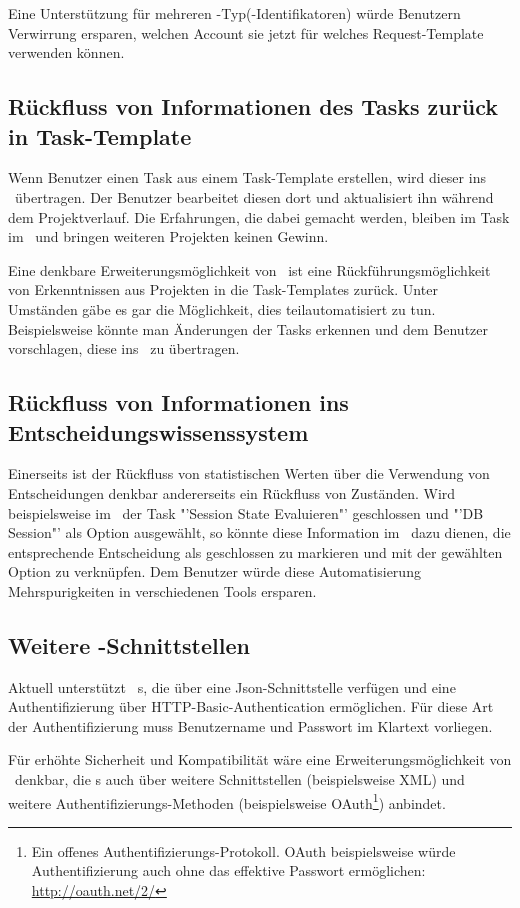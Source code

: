			Eine Unterstützung für mehreren \ppt-Typ(-Identifikatoren) würde Benutzern Verwirrung ersparen,
			welchen Account sie jetzt für welches Request-Template verwenden können.
			
			
		\subsection{Rückfluss von Informationen des Tasks zurück in Task-Template}
		\label{subsec:informationFlowbackFeature}
			Wenn Benutzer einen Task aus einem Task-Template erstellen, wird dieser ins \ppt\ übertragen.
			Der Benutzer bearbeitet diesen dort und aktualisiert ihn während dem Projektverlauf.
			Die Erfahrungen, die dabei gemacht werden, bleiben im Task im \ppt\
			und bringen weiteren Projekten keinen Gewinn.
			
			Eine denkbare Erweiterungsmöglichkeit von \eeppi\ ist eine Rückführungsmöglichkeit von
			Erkenntnissen aus Projekten in die Task-Templates zurück.
			Unter Umständen gäbe es gar die Möglichkeit, dies teilautomatisiert zu tun.
			Beispielsweise könnte man Änderungen der Tasks erkennen und dem Benutzer vorschlagen, diese ins \eeppi\ zu übertragen.
			
			
		\subsection{Rückfluss von Informationen ins Entscheidungswissenssystem}
		\label{subsec:informationFlowbackFeatureDKS}
			Einerseits ist der Rückfluss von statistischen Werten über die Verwendung von Entscheidungen denkbar 
			andererseits ein Rückfluss von Zuständen.
			Wird beispielsweise im \ppt\ der Task "'Session State Evaluieren"' geschlossen und "'DB Session"' als Option ausgewählt, 
			so könnte diese Information im \dks\ dazu dienen, 
			die entsprechende Entscheidung als geschlossen zu markieren und mit der gewählten Option zu verknüpfen.
			Dem Benutzer würde diese Automatisierung Mehrspurigkeiten in verschiedenen Tools ersparen.


		\subsection{Weitere \ppt-Schnittstellen}
		\label{subsec:morePPTInterfaces}
			Aktuell unterstützt \eeppi\ \ppt s, die über eine Json-Schnittstelle verfügen
			und eine Authentifizierung über HTTP-Basic-Authentication ermöglichen.
			Für diese Art der Authentifizierung muss Benutzername und Passwort im Klartext vorliegen.
			
			Für erhöhte Sicherheit und Kompatibilität wäre eine Erweiterungsmöglichkeit von \eeppi\ denkbar,
			die \ppt s auch über weitere Schnittstellen (beispielsweise XML)
			und weitere Authentifizierungs-Methoden (beispielsweise OAuth\footnote{Ein offenes Authentifizierungs-Protokoll. OAuth beispielsweise würde Authentifizierung auch ohne das effektive Passwort ermöglichen: \url{http://oauth.net/2/}}) anbindet.
			
